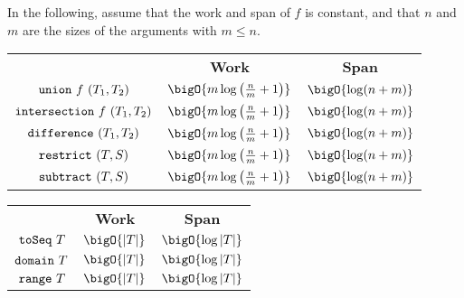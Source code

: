 \begin{costspec}[Combination]
In the following, assume that the work and span of $f$ is constant, and that
$n$ and $m$ are the sizes of the arguments with $m \leq n$.
\begin{tabular}{c|c|c}
& \textbf{Work} & \textbf{Span} \\
$\texttt{union}~f~(T_1, T_2)$ &
$\bigO{m \log\left(\frac n m + 1\right)}$ &
$\bigO{\log(n + m)}$
\\
$\texttt{intersection}~f~(T_1, T_2)$ &
$\bigO{m \log\left(\frac n m + 1\right)}$ &
$\bigO{\log(n + m)}$
\\
$\texttt{difference}~(T_1, T_2)$ &
$\bigO{m \log\left(\frac n m + 1\right)}$ &
$\bigO{\log(n + m)}$
\\
$\texttt{restrict}~(T, S)$ &
$\bigO{m \log\left(\frac n m + 1\right)}$ &
$\bigO{\log(n + m)}$
\\
$\texttt{subtract}~(T, S)$ &
$\bigO{m \log\left(\frac n m + 1\right)}$ &
$\bigO{\log(n + m)}$
\end{tabular}
\end{costspec}

\begin{costspec}[Miscellaous]
\begin{tabular}{c|c|c}
& \textbf{Work} & \textbf{Span} \\
$\texttt{toSeq}~T$ & $\bigO{|T|}$ & $\bigO{\log|T|}$ \\
$\texttt{domain}~T$ & $\bigO{|T|}$ & $\bigO{\log|T|}$ \\
$\texttt{range}~T$ & $\bigO{|T|}$ & $\bigO{\log|T|}$
\end{tabular}
\end{costspec}

